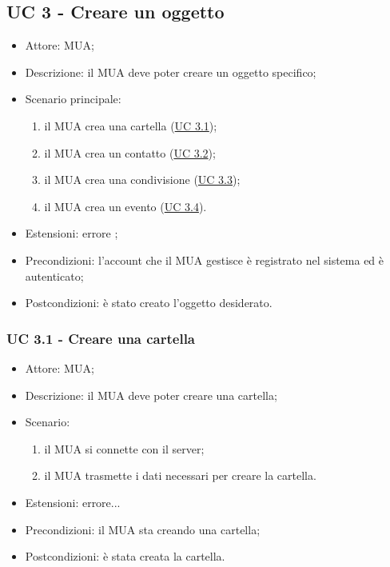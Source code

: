     \subsection{UC 3 - Creare un oggetto} \label{sec: UC 3}
    \begin{itemize}
        \item Attore: MUA;
        \item Descrizione: il MUA deve poter creare un oggetto specifico;
        \item Scenario principale:
            \begin{enumerate}
            \item il MUA crea una cartella (\hyperref[sec: UC 3.1]{UC 3.1});
            \item il MUA crea un contatto (\hyperref[sec: UC 3.2]{UC 3.2});
            \item il MUA crea una condivisione (\hyperref[sec: UC 3.3]{UC 3.3});
            \item il MUA crea un evento (\hyperref[sec: UC 3.4]{UC 3.4}).
            \end{enumerate}
        \item Estensioni: errore ;
        \item Precondizioni: l’account che il MUA gestisce è registrato nel sistema ed è autenticato;
        \item Postcondizioni: è stato creato l’oggetto desiderato.
    \end{itemize}

    \subsubsection{UC 3.1 - Creare una cartella} \label{sec: UC 3.1}
    \begin{itemize}
        \item Attore: MUA;
        \item Descrizione: il MUA deve poter creare una cartella;
        \item Scenario:
            \begin{enumerate}
            \item il MUA si connette con il server;
            \item il MUA trasmette i dati necessari per creare la cartella. %
            \end{enumerate}
        \item Estensioni: errore...
        \item Precondizioni: il MUA sta creando una cartella;
        \item Postcondizioni: è stata creata la cartella.
    \end{itemize}

